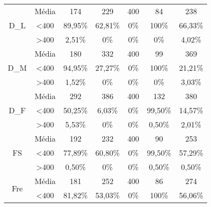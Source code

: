 \begin{table}[]
\begin{tabular}{|c|c|ccccc|}
\multirow{3}{*}{D\_L}           & Média            & 174               & 229               & 400               & 84                & 238               \\
                                & \textless 400    & 89,95\%           & 62,81\%           & 0\%            & 100\%          & 66,33\%           \\
                                & \textgreater 400 & 2,51\%            & 0\%            & 0\%            & 0\%            & 4,02\%            \\ \hline
\multirow{3}{*}{D\_M}           & Média            & 180               & 332               & 400               & 99                & 369               \\
                                & \textless 400    & 94,95\%           & 27,27\%           & 0\%            & 100\%          & 21,21\%           \\
                                & \textgreater 400 & 1,52\%            & 0\%            & 0\%            & 0\%            & 3,03\%            \\ \hline
\multirow{3}{*}{D\_F}           & Média            & 292               & 386               & 400               & 132               & 380               \\
                                & \textless 400    & 50,25\%           & 6,03\%            & 0\%            & 99,50\%           & 14,57\%           \\
                                & \textgreater 400 & 5,53\%            & 0\%            & 0\%            & 0,50\%            & 2,01\%            \\ \hline
\multirow{3}{*}{FS}             & Média            & 192               & 232               & 400               & 90                & 253               \\
                                & \textless 400    & 77,89\%           & 60,80\%           & 0\%            & 99,50\%           & 57,29\%           \\
                                & \textgreater 400 & 0,50\%            & 0\%            & 0\%            & 0,50\%            & 0,50\%            \\ \hline
\multirow{3}{*}{Fre}            & Média            & 181               & 252               & 400               & 86                & 274               \\
                                & \textless 400    & 81,82\%           & 53,03\%           & 0\%            & 100\%          & 56,06\%           \\

\end{tabular}
\end{table}
